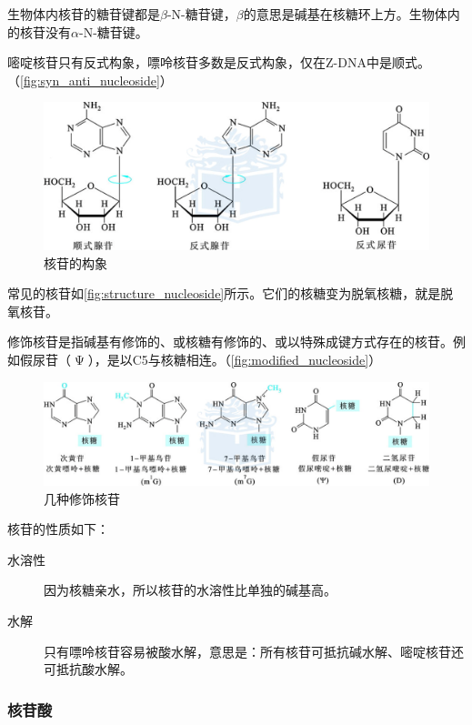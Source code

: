 生物体内核苷的糖苷键都是$\beta$-N-糖苷键，$\beta$的意思是碱基在核糖环上方。生物体内的核苷没有$\alpha$-N-糖苷键。

嘧啶核苷只有反式构象，嘌呤核苷多数是反式构象，仅在Z-DNA中是顺式。（\autoref{fig:syn_anti_nucleoside}）

\begin{figure}[htbp]
	\centering
	\includegraphics[width=0.7\linewidth]{Pics/核苷的构象}
	\caption{核苷的构象}
	\label{fig:syn_anti_nucleoside}
\end{figure}

常见的核苷如\autoref{fig:structure_nucleoside}所示。它们的核糖变为脱氧核糖，就是脱氧核苷。

修饰核苷是指碱基有修饰的、或核糖有修饰的、或以特殊成键方式存在的核苷。例如假尿苷（$\upPsi$），是以C5与核糖相连。（\autoref{fig:modified_nucleoside}）

\begin{figure}[htbp]
	\centering
	\includegraphics[width=\linewidth]{Pics/几种修饰核苷}
	\caption{几种修饰核苷}
	\label{fig:modified_nucleoside}
\end{figure}

核苷的性质如下：

\begin{description}
	\item[水溶性] 因为核糖亲水，所以核苷的水溶性比单独的碱基高。
	\item[水解] 只有嘌呤核苷容易被酸水解，意思是：所有核苷可抵抗碱水解、嘧啶核苷还可抵抗酸水解。
\end{description}

\subsubsection{核苷酸}

